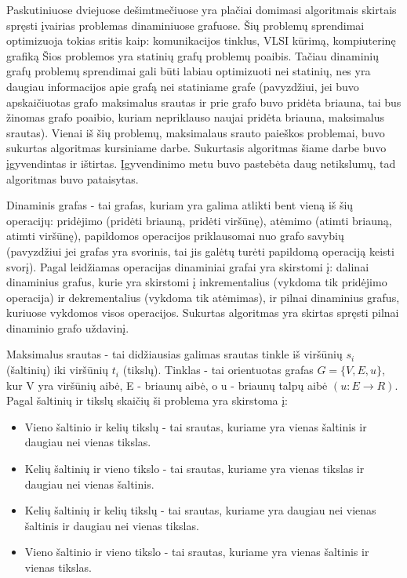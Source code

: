 Paskutiniuose dviejuose dešimtmečiuose yra plačiai domimasi algoritmais skirtais spręsti įvairias problemas dinaminiuose grafuose. Šių problemų sprendimai optimizuoja tokias sritis kaip: komunikacijos tinklus, VLSI kūrimą, kompiuterinę grafiką \cite{DynamicGraphs, DGA} Šios problemos yra statinių grafų problemų poaibis. Tačiau dinaminių grafų problemų sprendimai gali būti labiau optimizuoti nei statinių, nes yra daugiau informacijos apie grafą nei statiniame grafe (pavyzdžiui, jei buvo apskaičiuotas grafo maksimalus srautas ir prie grafo buvo pridėta briauna, tai bus žinomas grafo poaibio, kuriam nepriklauso naujai pridėta briauna, maksimalus srautas). Vienai iš šių problemų, maksimalaus srauto paieškos problemai, buvo sukurtas algoritmas kursiniame darbe. Sukurtasis algoritmas šiame darbe buvo  įgyvendintas ir ištirtas. Įgyvendinimo metu buvo pastebėta daug netikslumų, tad algoritmas buvo pataisytas.

Dinaminis grafas - tai grafas, kuriam yra galima atlikti bent vieną iš šių operacijų: pridėjimo (pridėti briauną, pridėti viršūnę), atėmimo (atimti briauną, atimti viršūnę), papildomos operacijos priklausomai nuo grafo savybių (pavyzdžiui jei grafas yra svorinis, tai jis galėtų turėti papildomą operaciją keisti svorį). Pagal leidžiamas operacijas dinaminiai grafai yra skirstomi į: dalinai dinaminius grafus, kurie yra skirstomi į inkrementalius (vykdoma tik pridėjimo operacija) ir dekrementalius (vykdoma tik atėmimas), ir pilnai dinaminius grafus, kuriuose vykdomos visos operacijos. Sukurtas algoritmas yra skirtas spręsti pilnai dinaminio grafo uždavinį.

Maksimalus srautas - tai didžiausias galimas srautas tinkle iš viršūnių $s_i$ (šaltinių) iki viršūnių $t_i$ (tikslų). Tinklas - tai orientuotas grafas $G= \{V, E, u\}$, kur V yra viršūnių aibė, E - briaunų aibė, o u - briaunų talpų aibė $( u : E \rightarrow R )$. Pagal šaltinių ir tikslų skaičių ši problema yra skirstoma į:
\begin{itemize}
	\item Vieno šaltinio ir kelių tikslų - tai srautas, kuriame yra vienas šaltinis ir daugiau nei vienas tikslas.
	\item Kelių šaltinių ir vieno tikslo - tai srautas, kuriame yra vienas tikslas ir daugiau nei vienas šaltinis.
	\item Kelių šaltinių ir kelių tikslų  - tai srautas, kuriame yra daugiau nei vienas šaltinis ir daugiau nei vienas tikslas.
	\item Vieno šaltinio ir vieno tikslo - tai srautas, kuriame yra vienas šaltinis ir vienas tikslas.
\end{itemize}

